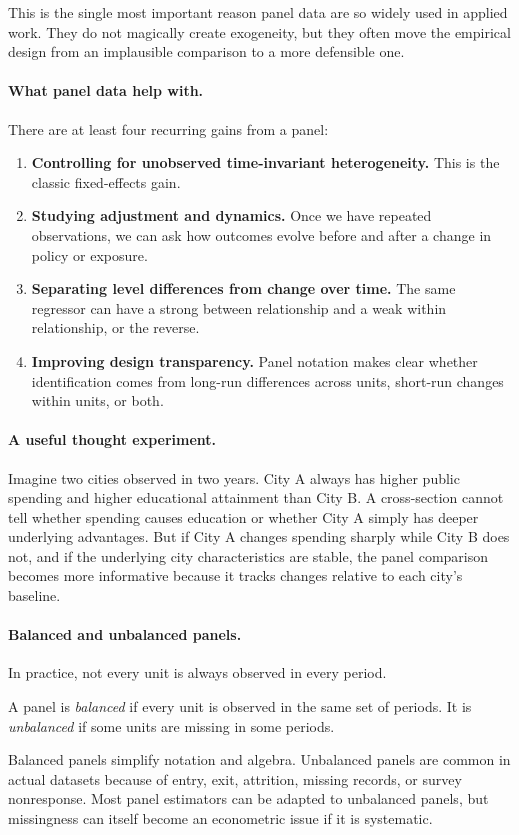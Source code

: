 This is the single most important reason panel data are so widely used in applied work. They do not magically create exogeneity, but they often move the empirical design from an implausible comparison to a more defensible one.

\paragraph{What panel data help with.}
There are at least four recurring gains from a panel:
\begin{enumerate}
\item \textbf{Controlling for unobserved time-invariant heterogeneity.} This is the classic fixed-effects gain.
\item \textbf{Studying adjustment and dynamics.} Once we have repeated observations, we can ask how outcomes evolve before and after a change in policy or exposure.
\item \textbf{Separating level differences from change over time.} The same regressor can have a strong between relationship and a weak within relationship, or the reverse.
\item \textbf{Improving design transparency.} Panel notation makes clear whether identification comes from long-run differences across units, short-run changes within units, or both.
\end{enumerate}

\paragraph{A useful thought experiment.}
Imagine two cities observed in two years. City A always has higher public spending and higher educational attainment than City B. A cross-section cannot tell whether spending causes education or whether City A simply has deeper underlying advantages. But if City A changes spending sharply while City B does not, and if the underlying city characteristics are stable, the panel comparison becomes more informative because it tracks changes relative to each city's baseline.

\paragraph{Balanced and unbalanced panels.}
In practice, not every unit is always observed in every period.
\begin{defN}
A panel is \emph{balanced} if every unit is observed in the same set of periods. It is \emph{unbalanced} if some units are missing in some periods.
\end{defN}
Balanced panels simplify notation and algebra. Unbalanced panels are common in actual datasets because of entry, exit, attrition, missing records, or survey nonresponse. Most panel estimators can be adapted to unbalanced panels, but missingness can itself become an econometric issue if it is systematic.

